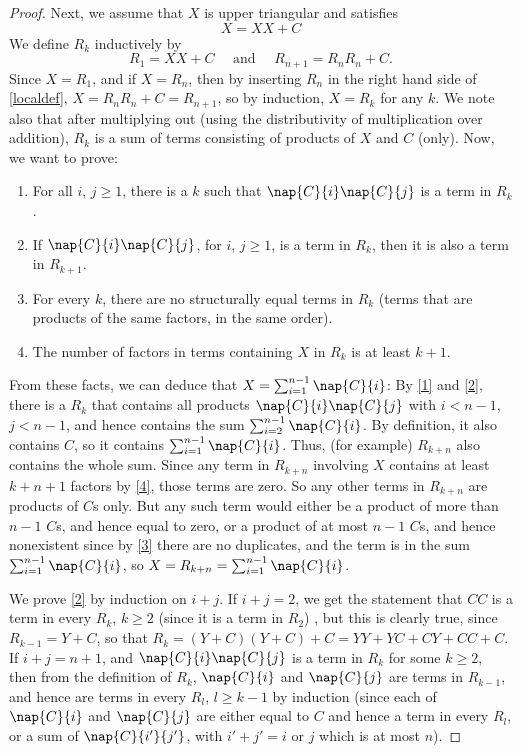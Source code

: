 \begin{proof}
   Next, we assume that $X$ is upper triangular and satisfies 
   \begin{equation*}
     \label{localdef}
     X = XX + C 
   \end{equation*}
   We define $R_k$ inductively by
   \begin{equation*}
     R_1 = XX + C \quad \text{ and } \quad R_{n + 1} = R_nR_n + C.
   \end{equation*}
   Since $X = R_1$, and if $X = R_n$, then by inserting $R_n$ in the right hand side of \eqref{localdef}, $X = R_nR_n + C = R_{n + 1}$, so by induction, $X = R_k$ for any $k$. We note also that after multiplying out (using the distributivity of multiplication over addition), $R_k$ is a sum of terms consisting of products of $X$ and $C$ (only). Now, we want to prove:
   \begin{enumerate}
   \item \label{1} For all $i$, $j \ge 1$, there is a $k$  such that $\nap{C}{i}\nap{C}{j}$ is a term in $R_k$.
   \item \label{2} If $\nap{C}{i}\nap{C}{j}$, for $i$, $j \ge 1$, is a term in $R_k$, then it is also a term in $R_{k + 1}$.
   \item \label{3} For every $k$, there are no structurally equal terms in $R_k$ (terms that are products of the same factors, in the same order).
   \item \label{4} The number of factors in terms containing $X$ in $R_k$ is at least $k + 1$. 
   \end{enumerate}
   From these facts, we can deduce that $X = \sum_{i = 1}^{n-1}\nap{C}{i}$: By \ref{1} and \ref{2}, there is a $R_k$ that contains all products $\nap{C}{i}\nap{C}{j}$ with $i < n - 1$, $j < n - 1$, and hence contains the sum $\sum_{i = 2}^{n-1}\nap{C}{i}$. By definition, it also contains $C$, so it contains $\sum_{i = 1}^{n-1}\nap{C}{i}$. Thus, (for example) $R_{k + n}$ also contains the whole sum. Since any term in $R_{k + n}$ involving $X$ contains at least $k + n + 1$ factors by \ref{4}, those terms are zero. So any other terms in $R_{k + n}$ are products of $C$s only. But any such term would either be a product of more than $n-1$  $C$s, and hence equal to zero, or a product of at most $n-1$ $C$s, and hence nonexistent since by \ref{3} there are no duplicates, and the term is in the sum $\sum_{i = 1}^{n-1}\nap{C}{i}$, so $X = R_{k + n} = \sum_{i = 1}^{n-1}\nap{C}{i}$.

We prove \ref{2} by induction on $i + j$. If $i+j = 2$, we get the statement that $CC$ is a term in every $R_k$, $k \ge 2$ (since it is a term in $R_2$) , but this is clearly true, since $R_{k - 1} = Y + C$, so that $R_{k} = (Y + C)(Y + C) + C = YY + YC + CY + CC + C$. If $i + j = n + 1$, and $\nap{C}{i}\nap{C}{j}$ is a term in $R_{k}$ for some $k \ge 2$, then from the definition of $R_k$, $\nap{C}{i}$ and $\nap{C}{j}$ are terms in $R_{k-1}$, and hence are terms in every $R_l$, $l \ge k-1$ by induction (since each of $\nap{C}{i}$ and $\nap{C}{j}$ are either equal to $C$ and hence a term in every $R_l$, or a sum of $\nap{C}{i'}{j'}$, with $i' + j' = i$ or $j$ which is at most $n$).


\end{proof}
